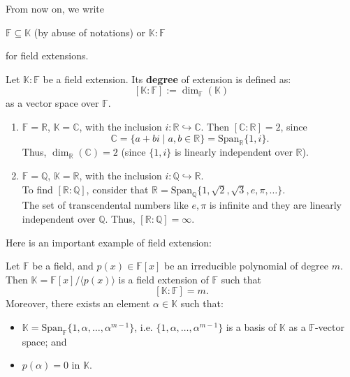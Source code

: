 From now on, we write
\begin{center}
    $\mathbb{F} \subseteq \mathbb{K}$ (by abuse of notations) or $\mathbb{K} : \mathbb{F}$
\end{center}
for field extensions.

\begin{definition}
Let $\mathbb{K} : \mathbb{F}$ be a field extension. Its \textbf{degree} of extension is defined as:
\[ [\mathbb{K}:\mathbb{F}] := \dim_{\mathbb{F}}(\mathbb{K})\]    
as a vector space over $\mathbb{F}$.
\end{definition}


\begin{example}
\begin{enumerate}
    \item $\mathbb{F}=\mathbb{R}$, $\mathbb{K}=\mathbb{C}$, with the inclusion $i: \mathbb{R} \hookrightarrow \mathbb{C}$. Then $[\mathbb{C}:\mathbb{R}] = 2$, since $$\mathbb{C} = \{a+bi \mid a,b \in \mathbb{R}\} = \text{Span}_{\mathbb{R}}\{1, i\}.$$
    Thus, $\dim_{\mathbb{R}}(\mathbb{C}) = 2$ (since $\{1,i\}$ is linearly independent over $\mathbb{R}$).

    \item $\mathbb{F}=\mathbb{Q}$, $\mathbb{K}=\mathbb{R}$, with the inclusion $i: \mathbb{Q} \hookrightarrow \mathbb{R}$. \\
    To find $[\mathbb{R}:\mathbb{Q}]$, consider that $\mathbb{R} = \text{Span}_{\mathbb{Q}}\{1, \sqrt{2}, \sqrt{3}, e, \pi, \dots\}$. \\
    The set of transcendental numbers like $e, \pi$ is infinite and they are linearly independent over $\mathbb{Q}$.
    Thus, $[\mathbb{R}:\mathbb{Q}] = \infty$.
\end{enumerate}
\end{example}

Here is an important example of field extension:
\begin{theorem}[Kronecker] \label{thm:kronecker}
Let $\mathbb{F}$ be a field, and $p(x) \in \mathbb{F}[x]$ be an irreducible polynomial of degree $m$.
Then $\mathbb{K} = \mathbb{F}[x]/\langle p(x) \rangle$ is a field extension of $\mathbb{F}$ such that 
$$[\mathbb{K}:\mathbb{F}]=m.$$
Moreover, there exists an element $\alpha \in \mathbb{K}$ such that:
\begin{itemize}
    \item $\mathbb{K} = \mathrm{Span}_{\mathbb{F}}\{1, \alpha, \dots, \alpha^{m-1}\}$, i.e. $\{1, \alpha, \dots, \alpha^{m-1}\}$ is a basis of $\mathbb{K}$ as a $\mathbb{F}$-vector space; and
    \item $p(\alpha) = 0$ in $\mathbb{K}$.
\end{itemize}
\end{theorem}

